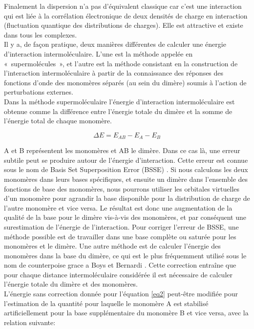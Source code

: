 Finalement la dispersion n’a pas d’équivalent classique car c’est une interaction qui est liée à la corrélation électronique de deux densités de charge en interaction (fluctuation quantique des distributions de charges). Elle est attractive et existe dans tous les complexes.\\

Il y a, de façon pratique, deux manières différentes de calculer une énergie d’interaction intermoléculaire. L’une est la méthode appelée en « supermolécules », et l’autre est la méthode consistant en la construction de l’interaction intermoléculaire à partir de la connaissance des réponses des fonctions d’onde des monomères séparés (au sein du dimère) soumis à l’action de perturbations externes.\\


Dans la méthode supermoléculaire l’énergie d’interaction intermoléculaire est obtenue comme la différence entre l’énergie totale du dimère et la somme de l’énergie total de chaque monomère.


\begin{equation}
\Delta E = E_{AB} - E_{A} - E_{B} \label{eq2}
\end{equation}

A et B représentent les monomères et AB le dimère. Dans ce cas là, une erreur subtile peut se produire autour de l’énergie d’interaction. Cette erreur est connue sous le nom de Basis Set Superposition Error (BSSE) \cite{sherrill2010counterpoise}. Si nous calculons les deux monomères dans leurs bases spécifiques, et ensuite un dimère dans l’ensemble des fonctions de base des monomères, nous pourrons utiliser les orbitales virtuelles d’un monomère pour agrandir la base disponible pour la distribution de charge de l’autre monomère et vice versa. Le résultat est donc une augmentation de la qualité de la base pour le dimère vis-à-vis des monomères, et par conséquent une surestimation de l’énergie de l’interaction. Pour corriger l’erreur de BSSE, une méthode possible est de travailler dans une base complète ou saturée pour les monomères et le dimère. Une autre méthode est de calculer l’énergie des monomères dans la base du dimère, ce qui est le plus fréquemment utilisé sous le nom de counterpoise grace a Boys et Bernardi \cite{boys1970calculation}. Cette correction entraîne que pour chaque distance intermoléculaire considérée il est nécessaire de calculer l’énergie totale du dimère et des monomères.\\

L’énergie sans correction donnée pour l’équation \ref{eq2}  peut-être modifiée pour l'estimation de la quantité pour laquelle le monomère A est stabilisé artificiellement pour la base supplémentaire du monomère B et vice versa, avec la relation suivante:

